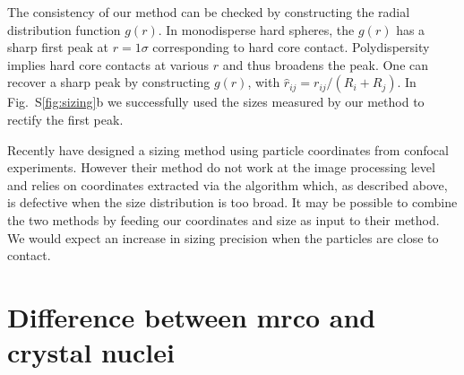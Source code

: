 \documentclass[prl,twocolumn,notitlepage]{revtex4-1}
\begin{document}
The consistency of our method can be checked by constructing the radial distribution function $g(r)$. In monodisperse hard spheres, the $g(r)$ has a sharp first peak at $r=1\sigma$ corresponding to hard core contact. Polydispersity implies hard core contacts at various $r$ and thus broadens the peak. One can recover a sharp peak by constructing $g(\hat{r})$, with $\hat{r}_{ij} = r_{ij}/(R_i+R_j)$. In Fig.~S\ref{fig:sizing}b we successfully used the sizes measured by our method to rectify the first peak.

Recently \citet{Kurita2011,Kurita2011b} have designed a sizing method using particle coordinates from confocal experiments. However their method do not work at the image processing level and relies on coordinates extracted via the \citet{Crocker1996} algorithm which, as described above, is defective when the size distribution is too broad. It may be possible to combine the two methods by feeding our coordinates and size as input to their method. We would expect an increase in sizing precision when the particles are close to contact.


\section*{Difference between {\sc mrco} and crystal nuclei}
\end{document}
